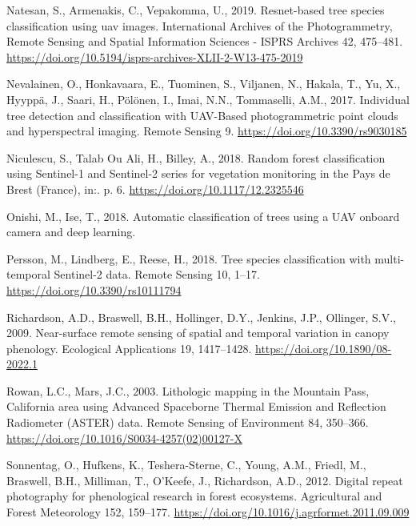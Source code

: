 \documentclass[]{article}
\begin{document}
\leavevmode\hypertarget{ref-Natesan2019}{}%
Natesan, S., Armenakis, C., Vepakomma, U., 2019. Resnet-based tree
species classification using uav images. International Archives of the
Photogrammetry, Remote Sensing and Spatial Information Sciences - ISPRS
Archives 42, 475--481.
\url{https://doi.org/10.5194/isprs-archives-XLII-2-W13-475-2019}

\leavevmode\hypertarget{ref-Nevalainen2017}{}%
Nevalainen, O., Honkavaara, E., Tuominen, S., Viljanen, N., Hakala, T.,
Yu, X., Hyyppä, J., Saari, H., Pölönen, I., Imai, N.N., Tommaselli,
A.M., 2017. Individual tree detection and classification with UAV-Based
photogrammetric point clouds and hyperspectral imaging. Remote Sensing
9. \url{https://doi.org/10.3390/rs9030185}

\leavevmode\hypertarget{ref-Niculescu2018}{}%
Niculescu, S., Talab Ou Ali, H., Billey, A., 2018. Random forest
classification using Sentinel-1 and Sentinel-2 series for vegetation
monitoring in the Pays de Brest (France), in:. p. 6.
\url{https://doi.org/10.1117/12.2325546}

\leavevmode\hypertarget{ref-Onishi2018a}{}%
Onishi, M., Ise, T., 2018. Automatic classification of trees using a UAV
onboard camera and deep learning.

\leavevmode\hypertarget{ref-Persson2018}{}%
Persson, M., Lindberg, E., Reese, H., 2018. Tree species classification
with multi-temporal Sentinel-2 data. Remote Sensing 10, 1--17.
\url{https://doi.org/10.3390/rs10111794}

\leavevmode\hypertarget{ref-Richardson2009}{}%
Richardson, A.D., Braswell, B.H., Hollinger, D.Y., Jenkins, J.P.,
Ollinger, S.V., 2009. Near-surface remote sensing of spatial and
temporal variation in canopy phenology. Ecological Applications 19,
1417--1428. \url{https://doi.org/10.1890/08-2022.1}

\leavevmode\hypertarget{ref-Rowan2003}{}%
Rowan, L.C., Mars, J.C., 2003. Lithologic mapping in the Mountain Pass,
California area using Advanced Spaceborne Thermal Emission and
Reflection Radiometer (ASTER) data. Remote Sensing of Environment 84,
350--366. \url{https://doi.org/10.1016/S0034-4257(02)00127-X}

\leavevmode\hypertarget{ref-Sonnentag2012}{}%
Sonnentag, O., Hufkens, K., Teshera-Sterne, C., Young, A.M., Friedl, M.,
Braswell, B.H., Milliman, T., O'Keefe, J., Richardson, A.D., 2012.
Digital repeat photography for phenological research in forest
ecosystems. Agricultural and Forest Meteorology 152, 159--177.
\url{https://doi.org/10.1016/j.agrformet.2011.09.009}
\end{document}

